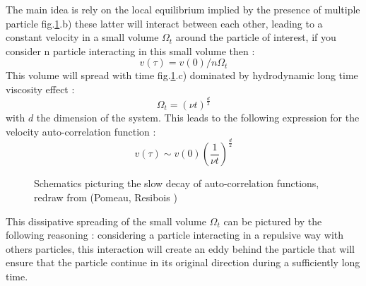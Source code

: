 \documentclass[ansiapaper]{report}
\begin{document}
\begin{multicols}{3}
The main idea is rely on the local equilibrium implied by the presence of multiple particle fig.\ref{fig:long_time_tail}.b) these latter will interact between each other, leading to a constant velocity in a small volume $\Omega_t$ around the particle of interest, if you consider n particle interacting in this small volume then : 
 $$v(\tau) = v(0)/n \Omega_t$$
 This volume will spread with time fig.\ref{fig:long_time_tail}.c) dominated by hydrodynamic long time viscosity effect : $$\Omega_t = (\nu t)^{\frac{d}{2}}$$ with $d$ the dimension of the system. This leads to the following expression for the velocity auto-correlation function : 
 \begin{equation}
     v(\tau) \sim  v(0) \left( \frac{1}{\nu t} \right)^{\frac{d}{2}}     
    \label{eq:long_time_tail}
 \end{equation}
\begin{figure}[H]
		\def\svgwidth{\linewidth}
		
        \caption{Schematics picturing the slow decay of auto-correlation functions, redraw from (Pomeau, Resibois \cite{POMEAU})}
        \vspace{0.15cm}
        \label{fig:long_time_tail}
\end{figure}

This dissipative spreading of the small volume $\Omega_t$ can be pictured by the following reasoning : considering a particle interacting in a repulsive way with others particles, this interaction will create an eddy behind the particle that will ensure that the particle continue in its original direction during a sufficiently long time. 

\end{multicols}
\end{document}
